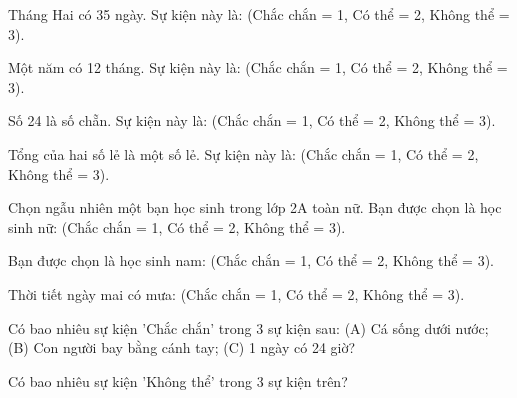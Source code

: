 \begin{ex}
Tháng Hai có 35 ngày. Sự kiện này là: (Chắc chắn = 1, Có thể = 2, Không thể = 3).
\end{ex}

\begin{ex}
Một năm có 12 tháng. Sự kiện này là: (Chắc chắn = 1, Có thể = 2, Không thể = 3).
\end{ex}

\begin{ex}
Số 24 là số chẵn. Sự kiện này là: (Chắc chắn = 1, Có thể = 2, Không thể = 3).
\end{ex}

\begin{ex}
Tổng của hai số lẻ là một số lẻ. Sự kiện này là: (Chắc chắn = 1, Có thể = 2, Không thể = 3).
\end{ex}

\begin{ex}
Chọn ngẫu nhiên một bạn học sinh trong lớp 2A toàn nữ. Bạn được chọn là học sinh nữ: (Chắc chắn = 1, Có thể = 2, Không thể = 3).
\end{ex}

\begin{ex}
Bạn được chọn là học sinh nam: (Chắc chắn = 1, Có thể = 2, Không thể = 3).
\end{ex}

\begin{ex}
Thời tiết ngày mai có mưa: (Chắc chắn = 1, Có thể = 2, Không thể = 3).
\end{ex}

\begin{ex}
Có bao nhiêu sự kiện 'Chắc chắn' trong 3 sự kiện sau: (A) Cá sống dưới nước; (B) Con người bay bằng cánh tay; (C) 1 ngày có 24 giờ?
\end{ex}

\begin{ex}
Có bao nhiêu sự kiện 'Không thể' trong 3 sự kiện trên?
\end{ex}
